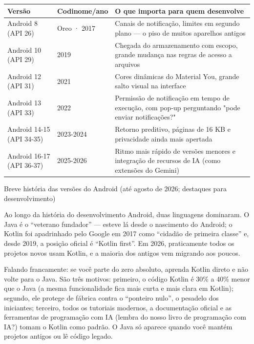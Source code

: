 \begin{center}
\begin{tabularx}{\linewidth}{|X|X|X|}
\hline
\textbf{Versão} & \textbf{Codinome/ano} & \textbf{O que importa para quem desenvolve} \tabularnewline
\hline
Android 8 (API 26) & Oreo · 2017 & Canais de notificação, limites em segundo plano — o piso de muitos aparelhos antigos \tabularnewline
Android 10 (API 29) & 2019 & Chegada do armazenamento com escopo, grande mudança nas regras de acesso a arquivos \tabularnewline
Android 12 (API 31) & 2021 & Cores dinâmicas do Material You, grande salto visual na interface \tabularnewline
Android 13 (API 33) & 2022 & Permissão de notificação em tempo de execução, com pop-up perguntando "pode enviar notificações?" \tabularnewline
Android 14-15 (API 34-35) & 2023-2024 & Retorno preditivo, páginas de 16 KB e privacidade ainda mais apertada \tabularnewline
Android 16-17 (API 36-37) & 2025-2026 & Ritmo mais rápido de versões menores e integração de recursos de IA (como extensões do Gemini) \tabularnewline
\hline
\end{tabularx}
\end{center}

\begin{center}\small\color{gray}Breve história das versões do Android (até agosto de 2026; destaques para desenvolvimento)\end{center}


Ao longo da história do desenvolvimento Android, duas linguagens dominaram. O Java é o “veterano fundador” — esteve lá desde o nascimento do Android; o Kotlin foi apadrinhado pelo Google em 2017 como “cidadão de primeira classe” e, desde 2019, a posição oficial é “Kotlin first”. Em 2026, praticamente todos os projetos novos usam Kotlin, e a maioria dos antigos vem migrando aos poucos.

Falando francamente: se você parte do zero absoluto, aprenda Kotlin direto e não volte para o Java. São três motivos: primeiro, o código Kotlin é 30\% a 40\% menor que o Java (a mesma funcionalidade fica mais curta e mais clara em Kotlin); segundo, ele protege de fábrica contra o “ponteiro nulo”, o pesadelo dos iniciantes; terceiro, todos os tutoriais modernos, a documentação oficial e as ferramentas de programação com IA (lembra do nosso livro de programação com IA?) tomam o Kotlin como padrão. O Java só aparece quando você mantém projetos antigos ou lê código legado.

